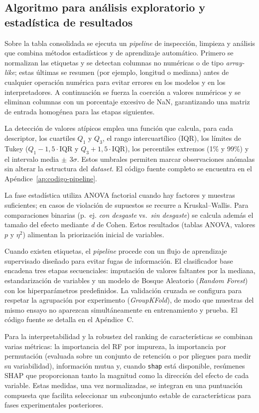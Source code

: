 \documentclass[12pt, letterpaper]{report}
\begin{document}
\subsection{Algoritmo para análisis exploratorio y estadística de resultados}

Sobre la tabla consolidada se ejecuta un \textit{pipeline} de inspección, limpieza y análisis que combina métodos estadísticos y de aprendizaje automático. Primero se normalizan las etiquetas y se detectan columnas no numéricas o de tipo \textit{array-like}; estas últimas se resumen (por ejemplo, longitud o mediana) antes de cualquier operación numérica para evitar errores en los modelos y en los interpretadores. A continuación se fuerza la coerción a valores numéricos y se eliminan columnas con un porcentaje excesivo de NaN, garantizando una matriz de entrada homogénea para las etapas siguientes.

La detección de valores atípicos emplea una función que calcula, para cada descriptor, los cuartiles $Q_1$ y $Q_3$, el rango intercuartílico (IQR), los límites de Tukey ($Q_1 - 1{,}5\cdot\mathrm{IQR}$ y $Q_3 + 1{,}5\cdot\mathrm{IQR}$), los percentiles extremos (1\% y 99\%) y el intervalo media$\,\pm\,3\sigma$. Estos umbrales permiten marcar observaciones anómalas sin alterar la estructura del \textit{dataset}. El código fuente completo se encuentra en el Apéndice~\ref{ap:codigo-pipeline}.

La fase estadística utiliza ANOVA factorial cuando hay factores y muestras suficientes; en casos de violación de supuestos se recurre a Kruskal--Wallis. Para comparaciones binarias (p.~ej. \emph{con desgaste} vs.\ \emph{sin desgaste}) se calcula además el tamaño del efecto mediante \textit{d} de Cohen. Estos resultados (tablas ANOVA, valores $p$ y $\eta^2$) alimentan la priorización inicial de variables.

Cuando existen etiquetas, el \textit{pipeline} procede con un flujo de aprendizaje supervisado diseñado para evitar fugas de información. El clasificador base encadena tres etapas secuenciales: imputación de valores faltantes por la mediana, estandarización de variables y un modelo de Bosque Aleatorio (\textit{Random Forest}) con los hiperparámetros predefinidos. La validación cruzada se configura para respetar la agrupación por experimento (\textit{GroupKFold}), de modo que muestras del mismo ensayo no aparezcan simultáneamente en entrenamiento y prueba. El código fuente se detalla en el Apéndice~C.

Para la interpretabilidad y la robustez del ranking de características se combinan varias métricas: la importancia del RF por impureza, la importancia por permutación (evaluada sobre un conjunto de retención o por pliegues para medir su variabilidad), información mutua y, cuando \texttt{shap} está disponible, resúmenes SHAP que proporcionan tanto la magnitud como la dirección del efecto de cada variable. Estas medidas, una vez normalizadas, se integran en una puntuación compuesta que facilita seleccionar un subconjunto estable de características para fases experimentales posteriores.
\end{document}
